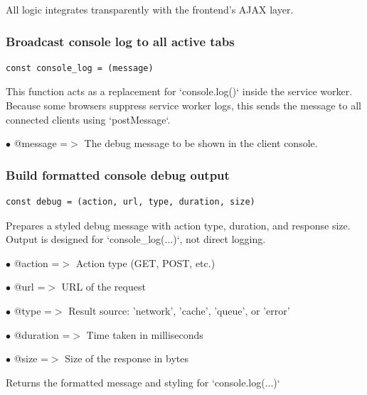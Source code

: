 \documentclass[a4paper]{article}
\begin{document}
All logic integrates transparently with the frontend’s AJAX layer.

\hypertarget{toc262}{}
\subsubsection{Broadcast console log to all active tabs}

\begin{lstlisting}
const console_log = (message)
\end{lstlisting}

This function acts as a replacement for `console.log()` inside the service worker.
Because some browsers suppress service worker logs, this sends the message
to all connected clients using `postMessage`.

\begin{compactitem}
\item[\color{myblue}$\bullet$] @message =$>$ The debug message to be shown in the client console.
\end{compactitem}

\hypertarget{toc263}{}
\subsubsection{Build formatted console debug output}

\begin{lstlisting}
const debug = (action, url, type, duration, size)
\end{lstlisting}

Prepares a styled debug message with action type, duration, and response size.
Output is designed for `console\_log(...)`, not direct logging.

\begin{compactitem}
\item[\color{myblue}$\bullet$] @action   =$>$ Action type (GET, POST, etc.)
\item[\color{myblue}$\bullet$] @url      =$>$ URL of the request
\item[\color{myblue}$\bullet$] @type     =$>$ Result source: 'network', 'cache', 'queue', or 'error'
\item[\color{myblue}$\bullet$] @duration =$>$ Time taken in milliseconds
\item[\color{myblue}$\bullet$] @size     =$>$ Size of the response in bytes
\end{compactitem}

Returns the formatted message and styling for `console.log(...)`
\end{document}
